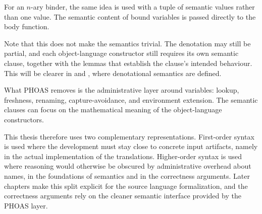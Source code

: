For an \(n\)-ary binder, the same idea is used with a tuple of semantic values rather than one value.
The semantic content of bound variables is passed directly to the body function.

Note that this does not make the semantics trivial.
The denotation may still be partial, and each object-language constructor still requires its own semantic clause, together with the lemmas that establish the clause's intended behaviour.
This will be clearer in  and , where denotational semantics are defined.

What PHOAS removes is the administrative layer around variables: lookup, freshness, renaming, capture-avoidance, and environment extension.
The semantic clauses can focus on the mathematical meaning of the object-language constructors.

This thesis therefore uses two complementary representations.
First-order syntax is used where the development must stay close to concrete input artifacts,
namely in the actual implementation of the translations.
Higher-order syntax is used where reasoning would otherwise be obscured by administrative overhead
about names, \ie in the foundations of semantics and in the correctness arguments.
Later chapters make this split explicit for the source language formalization, and the correctness arguments rely on the cleaner semantic interface provided by the PHOAS layer.
